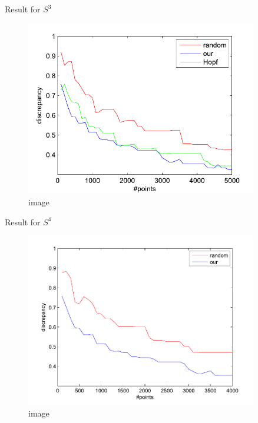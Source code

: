 \documentclass[10pt,ignorenonframetext,serif,onlymath]{beamer}
\begin{document}
\begin{frame}{Result for \(S^3\)}
\protect\hypertarget{result-for-s3}{}

\begin{figure}
\centering
\includegraphics[width=0.9\textwidth,height=\textheight]{res_hopf.pdf}
\caption{image}
\end{figure}

\end{frame}

\begin{frame}{Result for \(S^4\)}
\protect\hypertarget{result-for-s4}{}

\begin{figure}
\centering
\includegraphics[width=0.9\textwidth,height=\textheight]{res_S4.pdf}
\caption{image}
\end{figure}

\end{frame}
\end{document}
